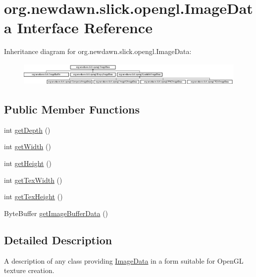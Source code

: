 \hypertarget{interfaceorg_1_1newdawn_1_1slick_1_1opengl_1_1_image_data}{}\section{org.\+newdawn.\+slick.\+opengl.\+Image\+Data Interface Reference}
\label{interfaceorg_1_1newdawn_1_1slick_1_1opengl_1_1_image_data}
Inheritance diagram for org.\+newdawn.\+slick.\+opengl.\+Image\+Data\+:\begin{figure}[H]
\begin{center}
\leavevmode
\includegraphics[height=1.166667cm]{interfaceorg_1_1newdawn_1_1slick_1_1opengl_1_1_image_data}
\end{center}
\end{figure}
\subsection*{Public Member Functions}
\begin{DoxyCompactItemize}
\item 
int \mbox{\hyperlink{interfaceorg_1_1newdawn_1_1slick_1_1opengl_1_1_image_data_a69be40348e05222e8f0c65f5845adcb9}{get\+Depth}} ()
\item 
int \mbox{\hyperlink{interfaceorg_1_1newdawn_1_1slick_1_1opengl_1_1_image_data_a59fd53f0ca1e501de35c1b2b4a7e69c5}{get\+Width}} ()
\item 
int \mbox{\hyperlink{interfaceorg_1_1newdawn_1_1slick_1_1opengl_1_1_image_data_acce23925ae561e75f051d3287a8dda06}{get\+Height}} ()
\item 
int \mbox{\hyperlink{interfaceorg_1_1newdawn_1_1slick_1_1opengl_1_1_image_data_abf26e8dcbf2ec52f9a49535d8912263e}{get\+Tex\+Width}} ()
\item 
int \mbox{\hyperlink{interfaceorg_1_1newdawn_1_1slick_1_1opengl_1_1_image_data_a316891c94ba43967d0554378c7197324}{get\+Tex\+Height}} ()
\item 
Byte\+Buffer \mbox{\hyperlink{interfaceorg_1_1newdawn_1_1slick_1_1opengl_1_1_image_data_a7b15d49f552cad075bb1179668ce5250}{get\+Image\+Buffer\+Data}} ()
\end{DoxyCompactItemize}


\subsection{Detailed Description}
A description of any class providing \mbox{\hyperlink{interfaceorg_1_1newdawn_1_1slick_1_1opengl_1_1_image_data}{Image\+Data}} in a form suitable for Open\+GL texture creation.


